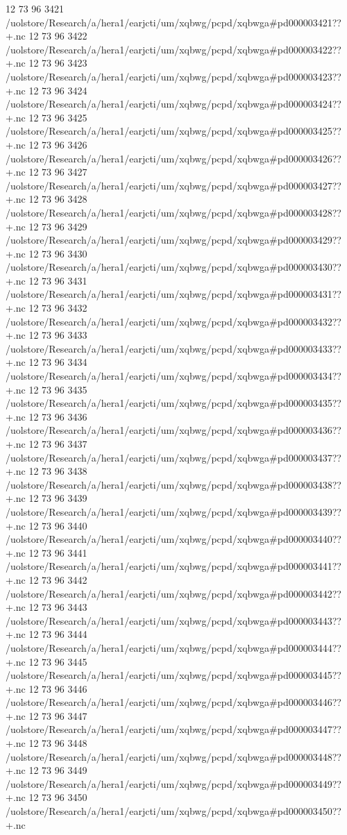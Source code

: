 12 73 96
3421
/uolstore/Research/a/hera1/earjcti/um/xqbwg/pcpd/xqbwga#pd000003421??+.nc
12 73 96
3422
/uolstore/Research/a/hera1/earjcti/um/xqbwg/pcpd/xqbwga#pd000003422??+.nc
12 73 96
3423
/uolstore/Research/a/hera1/earjcti/um/xqbwg/pcpd/xqbwga#pd000003423??+.nc
12 73 96
3424
/uolstore/Research/a/hera1/earjcti/um/xqbwg/pcpd/xqbwga#pd000003424??+.nc
12 73 96
3425
/uolstore/Research/a/hera1/earjcti/um/xqbwg/pcpd/xqbwga#pd000003425??+.nc
12 73 96
3426
/uolstore/Research/a/hera1/earjcti/um/xqbwg/pcpd/xqbwga#pd000003426??+.nc
12 73 96
3427
/uolstore/Research/a/hera1/earjcti/um/xqbwg/pcpd/xqbwga#pd000003427??+.nc
12 73 96
3428
/uolstore/Research/a/hera1/earjcti/um/xqbwg/pcpd/xqbwga#pd000003428??+.nc
12 73 96
3429
/uolstore/Research/a/hera1/earjcti/um/xqbwg/pcpd/xqbwga#pd000003429??+.nc
12 73 96
3430
/uolstore/Research/a/hera1/earjcti/um/xqbwg/pcpd/xqbwga#pd000003430??+.nc
12 73 96
3431
/uolstore/Research/a/hera1/earjcti/um/xqbwg/pcpd/xqbwga#pd000003431??+.nc
12 73 96
3432
/uolstore/Research/a/hera1/earjcti/um/xqbwg/pcpd/xqbwga#pd000003432??+.nc
12 73 96
3433
/uolstore/Research/a/hera1/earjcti/um/xqbwg/pcpd/xqbwga#pd000003433??+.nc
12 73 96
3434
/uolstore/Research/a/hera1/earjcti/um/xqbwg/pcpd/xqbwga#pd000003434??+.nc
12 73 96
3435
/uolstore/Research/a/hera1/earjcti/um/xqbwg/pcpd/xqbwga#pd000003435??+.nc
12 73 96
3436
/uolstore/Research/a/hera1/earjcti/um/xqbwg/pcpd/xqbwga#pd000003436??+.nc
12 73 96
3437
/uolstore/Research/a/hera1/earjcti/um/xqbwg/pcpd/xqbwga#pd000003437??+.nc
12 73 96
3438
/uolstore/Research/a/hera1/earjcti/um/xqbwg/pcpd/xqbwga#pd000003438??+.nc
12 73 96
3439
/uolstore/Research/a/hera1/earjcti/um/xqbwg/pcpd/xqbwga#pd000003439??+.nc
12 73 96
3440
/uolstore/Research/a/hera1/earjcti/um/xqbwg/pcpd/xqbwga#pd000003440??+.nc
12 73 96
3441
/uolstore/Research/a/hera1/earjcti/um/xqbwg/pcpd/xqbwga#pd000003441??+.nc
12 73 96
3442
/uolstore/Research/a/hera1/earjcti/um/xqbwg/pcpd/xqbwga#pd000003442??+.nc
12 73 96
3443
/uolstore/Research/a/hera1/earjcti/um/xqbwg/pcpd/xqbwga#pd000003443??+.nc
12 73 96
3444
/uolstore/Research/a/hera1/earjcti/um/xqbwg/pcpd/xqbwga#pd000003444??+.nc
12 73 96
3445
/uolstore/Research/a/hera1/earjcti/um/xqbwg/pcpd/xqbwga#pd000003445??+.nc
12 73 96
3446
/uolstore/Research/a/hera1/earjcti/um/xqbwg/pcpd/xqbwga#pd000003446??+.nc
12 73 96
3447
/uolstore/Research/a/hera1/earjcti/um/xqbwg/pcpd/xqbwga#pd000003447??+.nc
12 73 96
3448
/uolstore/Research/a/hera1/earjcti/um/xqbwg/pcpd/xqbwga#pd000003448??+.nc
12 73 96
3449
/uolstore/Research/a/hera1/earjcti/um/xqbwg/pcpd/xqbwga#pd000003449??+.nc
12 73 96
3450
/uolstore/Research/a/hera1/earjcti/um/xqbwg/pcpd/xqbwga#pd000003450??+.nc
